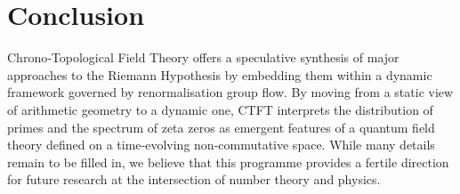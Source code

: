 \documentclass[11pt, a4paper]{article}
\theoremstyle{definition}
\begin{document}
\section{Conclusion}

Chrono‑Topological Field Theory offers a speculative synthesis of major approaches to the Riemann Hypothesis by embedding them within a dynamic framework governed by renormalisation group flow.  By moving from a static view of arithmetic geometry to a dynamic one, CTFT interprets the distribution of primes and the spectrum of zeta zeros as emergent features of a quantum field theory defined on a time‑evolving non‑commutative space.  While many details remain to be filled in, we believe that this programme provides a fertile direction for future research at the intersection of number theory and physics.



\end{document}
